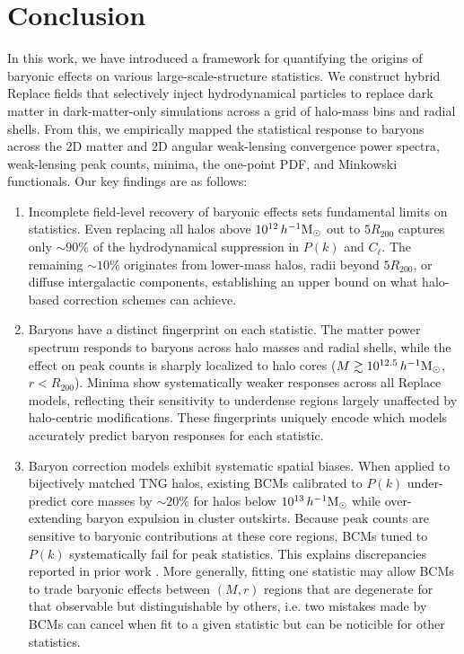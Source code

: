 \documentclass[linenumbers,trackchanges]{aastex701}
\begin{document}
\section{Conclusion}
\label{sec:conclusion}

In this work, we have introduced a framework for quantifying the origins of baryonic effects on various large-scale-structure statistics. We construct hybrid Replace fields that selectively inject hydrodynamical particles to replace dark matter in dark-matter-only simulations across a grid of halo-mass bins and radial shells. From this, we empirically mapped the statistical response to baryons across the 2D matter and 2D angular weak-lensing convergence power spectra, weak-lensing peak counts, minima, the one-point PDF, and Minkowski functionals. Our key findings are as follows:

\begin{enumerate}
\item Incomplete field-level recovery of baryonic effects sets fundamental limits on statistics. Even replacing all halos above $10^{12}\,h^{-1}{\rm M}_\odot$ out to $5R_{200}$ captures only $\sim90\%$ of the hydrodynamical suppression in $P(k)$ and $C_\ell$. The remaining $\sim10\%$ originates from lower-mass halos, radii beyond $5R_{200}$, or diffuse intergalactic components, establishing an upper bound on what halo-based correction schemes can achieve.

\item Baryons have a distinct fingerprint on each statistic. The matter power spectrum responds to baryons across halo masses and radial shells, while the effect on peak counts is sharply localized to halo cores ($M\gtrsim10^{12.5}\,h^{-1}{\rm M}_\odot$, $r < R_{200}$). Minima show systematically weaker responses across all Replace models, reflecting their sensitivity to underdense regions largely unaffected by halo-centric modifications. These fingerprints uniquely encode which models accurately predict baryon responses for each statistic.

\item Baryon correction models exhibit systematic spatial biases. When applied to bijectively matched TNG halos, existing BCMs calibrated to $P(k)$ under-predict core masses by $\sim20\%$ for halos below $10^{13}\,h^{-1}{\rm M}_\odot$ while over-extending baryon expulsion in cluster outskirts. Because peak counts are sensitive to baryonic contributions at these core regions, BCMs tuned to $P(k)$ systematically fail for peak statistics. This explains discrepancies reported in prior work \citep{leeComparingWeakLensing2022}. More generally, fitting one statistic may allow BCMs to trade baryonic effects between $(M, r)$ regions that are degenerate for that observable but distinguishable by others, i.e. two mistakes made by BCMs can cancel when fit to a given statistic but can be noticible for other statistics.
\end{enumerate}
\end{document}
